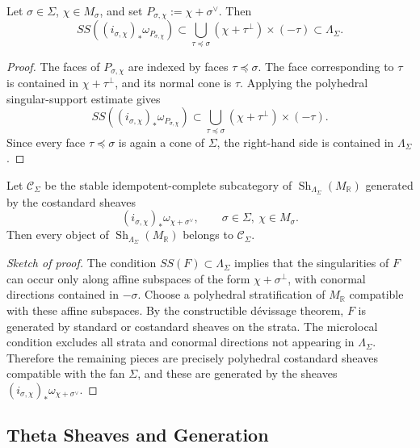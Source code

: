 \begin{proposition}\label{prop:theta-singular-support}
Let \(\sigma\in\Sigma\), \(\chi\in M_\sigma\), and set
\(P_{\sigma,\chi}:=\chi+\sigma^\vee\). Then
\[
SS((i_{\sigma,\chi})_*\omega_{P_{\sigma,\chi}})
\subset
\bigcup_{\tau\preceq\sigma}(\chi+\tau^\perp)\times(-\tau)
\subset \Lambda_\Sigma .
\]
\end{proposition}

\begin{proof}
The faces of \(P_{\sigma,\chi}\) are indexed by faces
\(\tau\preceq\sigma\). The face corresponding to \(\tau\) is contained in
\(\chi+\tau^\perp\), and its normal cone is \(\tau\). Applying the
polyhedral singular-support estimate gives
\[
SS((i_{\sigma,\chi})_*\omega_{P_{\sigma,\chi}})
\subset
\bigcup_{\tau\preceq\sigma}(\chi+\tau^\perp)\times(-\tau).
\]
Since every face \(\tau\preceq\sigma\) is again a cone of \(\Sigma\), the
right-hand side is contained in \(\Lambda_\Sigma\).
\end{proof}

\begin{lemma}\label{lem:polyhedral-devissage}
Let \(\mathcal C_\Sigma\) be the stable idempotent-complete subcategory of
\(\operatorname{Sh}_{\Lambda_\Sigma}(M_{\mathbb R})\) generated by the
costandard sheaves
\[
(i_{\sigma,\chi})_*\omega_{\chi+\sigma^\vee},
\qquad \sigma\in\Sigma,\ \chi\in M_\sigma .
\]
Then every object of
\(\operatorname{Sh}_{\Lambda_\Sigma}(M_{\mathbb R})\) belongs to
\(\mathcal C_\Sigma\).
\end{lemma}

\begin{proof}[Sketch of proof]
The condition \(SS(F)\subset \Lambda_\Sigma\) implies that the singularities
of \(F\) can occur only along affine subspaces of the form
\(\chi+\sigma^\perp\), with conormal directions contained in \(-\sigma\).
Choose a polyhedral stratification of \(M_{\mathbb R}\) compatible with these
affine subspaces. By the constructible dévissage theorem, \(F\) is generated
by standard or costandard sheaves on the strata. The microlocal condition
excludes all strata and conormal directions not appearing in
\(\Lambda_\Sigma\). Therefore the remaining pieces are precisely
polyhedral costandard sheaves compatible with the fan \(\Sigma\), and these
are generated by the sheaves
\((i_{\sigma,\chi})_*\omega_{\chi+\sigma^\vee}\).
\end{proof}


\subsection{Theta Sheaves and Generation}

